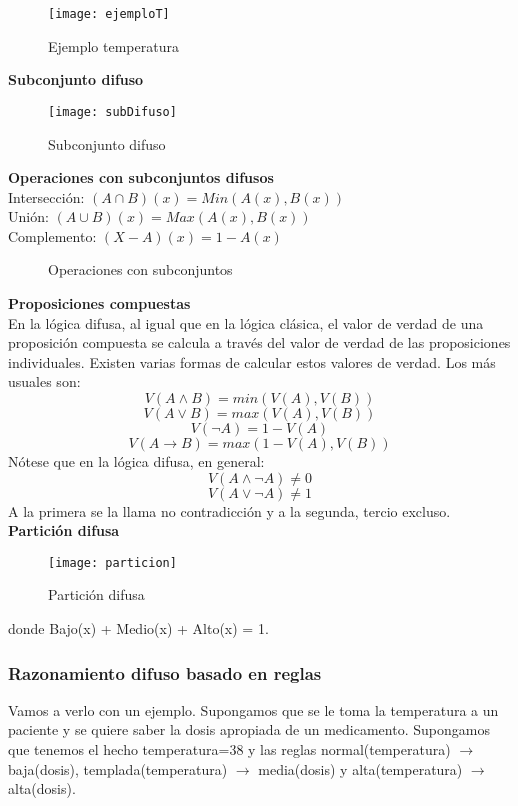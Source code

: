 \documentclass[12pt]{article}
\begin{document}
\begin{figure}[H]
\centering
\texttt{[image: ejemploT]}
\caption{Ejemplo temperatura}
\label{fig:ejemploT}
\end{figure}

\textbf{Subconjunto difuso}
\begin{figure}[H]
\centering
\texttt{[image: subDifuso]}
\caption{Subconjunto difuso}
\label{fig:subDifuso}
\end{figure}

\textbf{Operaciones con subconjuntos difusos}\\
Intersección: $(A \cap B)(x)=Min(A(x),B(x))$\\
Unión: $(A \cup B)(x)=Max(A(x),B(x))$\\
Complemento: $(X-A)(x)=1-A(x)$

\begin{figure}[H]
 \centering
 \caption{Operaciones con subconjuntos}
 \label{f:mycin}
\end{figure}

\textbf{Proposiciones compuestas}\\
En la lógica difusa, al igual que en la lógica clásica, el valor de verdad de una proposición compuesta se calcula a través del valor de verdad de las proposiciones individuales. Existen varias formas de calcular estos valores de verdad. Los más usuales son:
\[	V(A \wedge B) = min(V(A),V(B))	\]
\[	V(A \vee B) = max(V(A),V(B))	\]
\[	V(\neg A) = 1 - V(A)	\]
\[	V(A \rightarrow B) = max(1-V(A),V(B))	\]
Nótese que en la lógica difusa, en general:
\[	V(A \wedge \neg A) \neq 0	\]
\[	V(A \vee \neg A) \neq 1	\]
A la primera se la llama no contradicción y a la segunda, tercio excluso.\\

\textbf{Partición difusa}\\
\begin{figure}[H]
\centering
\texttt{[image: particion]}
\caption{Partición difusa}
\label{fig:particion}
\end{figure}

donde Bajo(x) + Medio(x) + Alto(x) = 1.

\subsubsection{Razonamiento difuso basado en reglas}
Vamos a verlo con un ejemplo. Supongamos que se le toma la temperatura a un paciente y se quiere saber la dosis apropiada de un medicamento. Supongamos que tenemos el hecho temperatura=38 y las reglas normal(temperatura) $\rightarrow$ baja(dosis), templada(temperatura) $\rightarrow$ media(dosis) y alta(temperatura) $\rightarrow$ alta(dosis).
\end{document}
